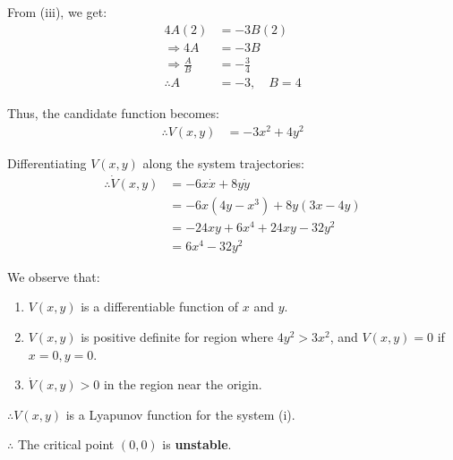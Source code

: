From (iii), we get:
\begin{align*}
    4 A (2) &= -3 B (2) \\
    \Rightarrow 4 A &= -3 B \\
    \Rightarrow \frac{A}{B} &= -\frac{3}{4} \\
    \therefore A &= -3, \quad B = 4
\end{align*}

Thus, the candidate function becomes:
\begin{align*}
    \therefore V(x,y) &= -3 x^2 + 4 y^2
\end{align*}

Differentiating $V(x,y)$ along the system trajectories:
\begin{align*}
    \therefore \dot{V}(x,y) &= -6 x \dot{x} + 8 y \dot{y} \\
    &= -6 x (4y - x^3) + 8 y (3x - 4y) \\
    &= -24 x y + 6 x^4 + 24 x y - 32 y^2 \\
    &= 6 x^4 - 32 y^2
\end{align*}

We observe that:
\begin{enumerate}
    \item $V(x,y)$ is a differentiable function of $x$ and $y$.
    \item $V(x,y)$ is positive definite for region where $4y^2 > 3x^2$, and $V(x,y) = 0$ if $x=0, y=0$.
    \item $\dot{V}(x,y) > 0$ in the region near the origin.
\end{enumerate}

\noindent $\therefore V(x,y)$ is a Lyapunov function for the system (i).

\noindent $\therefore$ The critical point $(0,0)$ is \textbf{unstable}.
